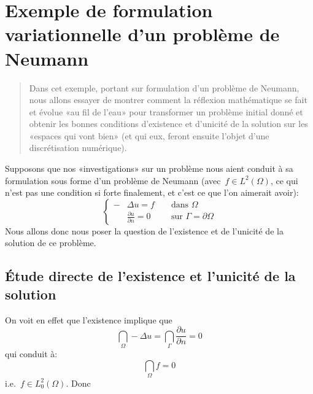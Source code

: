 \chapter{Exemple de formulation variationnelle d'un problème de Neumann}
\begin{abstract}
Dans cet exemple, portant sur formulation d'un problème de Neumann, nous allons essayer de montrer comment la réflexion mathématique se fait et évolue «au fil de l'eau» pour transformer un problème initial donné et obtenir les bonnes conditions d'existence et d'unicité de la solution sur les «espaces qui vont bien» (et qui eux, feront ensuite l'objet d'une discrétisation numérique).
\end{abstract}

Supposons que nos «investigations» sur un problème nous aient conduit à sa formulation sous forme d'un problème de Neumann (avec~$f\in L^2(\Omega)$, ce qui n'est pas une condition si forte finalement, et c'est ce que l'on aimerait avoir):
\begin{equation}\left\{
\begin{aligned}
-&\Delta u = f && \text{ dans } \Omega\\
&\frac{\partial u}{\partial n}=0 && \text{ sur }\Gamma=\partial\Omega
\end{aligned}
\right.
\end{equation}
Nous allons donc nous poser la question de l'existence et de l'unicité de la solution de ce problème.

\medskip
\section{Étude directe de l'existence et l'unicité de la solution}

On voit en effet que l'existence implique que
\begin{equation}\dint_\Omega -\Delta u = \dint_\Gamma \frac{\partial u}{\partial n}=0\end{equation}
qui conduit à:\begin{equation}\dint_\Omega f =0\end{equation} i.e.~$f\in L^2_0(\Omega)$.
Donc 


